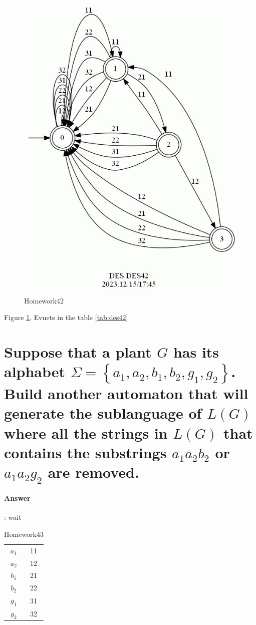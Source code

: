\documentclass{article}
\begin{document}
\begin{figure}
  \centering
  \includegraphics[width=0.6\linewidth]{assets/DES42.jpg}
  \caption{Homework42}
  \label{fig:des42}
\end{figure}

Figure \ref{fig:des42}, Evnets in the table \ref{tab:des42}

\section{Suppose that a plant $G$ has its alphabet $\Sigma=\left\{a_1, a_2, b_1, b_2, g_1, g_2\right\}$. Build another automaton that will generate the sublanguage of $L(G)$ where all the strings in $L(G)$ that contains the substrings $a_1 a_2 b_2$ or $a_1 a_2 g_2$ are removed.}

\paragraph{Answer}:
wait

\begin{table}
  \centering
  \begin{tabular}{|c|c|}
    $a_1$ & 11\\
    $a_2$ & 12\\
    \hline
    $b_1$ & 21\\
    $b_2$ & 22\\
    \hline
    $g_1$ & 31\\
    $g_2$ & 32\\
  \end{tabular}
  \caption{Homework43}
  \label{tab:des43}
\end{table}
\end{document}
